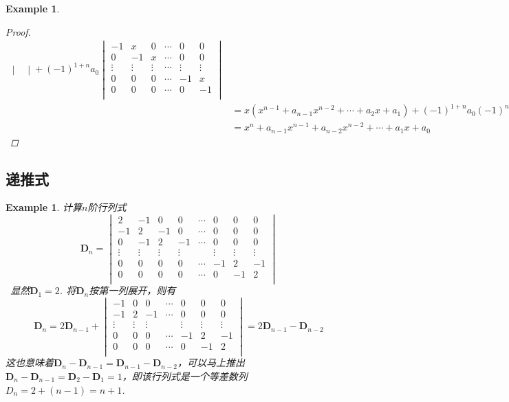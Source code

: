 \documentclass{article}
\newtheorem{example}[theorem]{Example}
\newcommand{\hints}{{\color{blue} \text{hints}}}
\newcommand{\mbf}[1]{\bm{#1}}
\begin{document}
\begin{example}
\begin{proof}
$$\begin{array}{ll}
\begin{vmatrix}
\end{vmatrix}+ (-1)^{1+n}a_0 \begin{vmatrix}
-1 & x & 0  & \cdots & 0 & 0  \\
0 & -1 & x  & \cdots & 0 & 0 \\
\vdots & \vdots & \vdots  & \cdots & \vdots & \vdots  \\
0 & 0 & 0  & \cdots & -1 & x  \\
0 & 0 & 0  & \cdots & 0 & -1  \\
\end{vmatrix}  \\
&=x(x^{n-1} + a_{n-1}x^{n-2} + \cdots + a_2x + a_1) + (-1)^{1+n}a_0(-1)^{n-1} \\
&=  x^n + a_{n-1}x^{n-1} + a_{n-2}x^{n-2} + \cdots + a_1x + a_0
\end{array}
$$
\end{proof}
\end{example}

\subsection{递推式}


\begin{example}
\rm 计算$n$阶行列式
$$
\mbf{D}_n = \begin{vmatrix}
2 & -1 & 0 & 0 & \cdots & 0 & 0 & 0\\
-1 & 2 & -1 & 0 & \cdots & 0 & 0 & 0\\
0 & -1 & 2 & -1 & \cdots & 0 & 0 & 0\\
\vdots & \vdots & \vdots & \vdots & & \vdots & \vdots & \vdots\\
0 & 0 & 0 & 0 & \cdots & -1 & 2 & -1\\
0 & 0 & 0 & 0 & \cdots & 0 & -1 & 2\\
\end{vmatrix}
$$
\hints\ 显然$\mbf{D}_1 = 2$. 将$\mbf{D}_n$按第一列展开，则有
$$
\mbf{D}_n = 2\mbf{D}_{n-1}+
\begin{vmatrix}
 -1 & 0 & 0 & \cdots & 0 & 0 & 0\\
 -1 & 2 & -1 & \cdots & 0 & 0 & 0\\
 \vdots & \vdots & \vdots & & \vdots & \vdots & \vdots\\
 0 & 0 & 0 & \cdots & -1 & 2 & -1\\
 0 & 0 & 0 & \cdots & 0 & -1 & 2\\
\end{vmatrix} = 2\mbf{D}_{n-1} - \mbf{D}_{n-2}
$$
这也意味着$\mbf{D}_n - \mbf{D}_{n-1} = \mbf{D}_{n-1}-\mbf{D}_{n-2}$，可以马上推出$\mbf{D}_n - \mbf{D}_{n-1} = \mbf{D}_2-\mbf{D}_1 = 1$，即该行列式是一个等差数列$D_n = 2+(n-1) = n+1$. 
\end{example}
\end{document}
